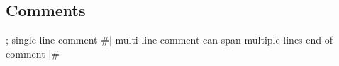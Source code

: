 
\subsection{Comments}

\begin{racketcode}
; single line comment
#|
multi-line-comment
can span
multiple lines
end of comment
|#
\end{racketcode}